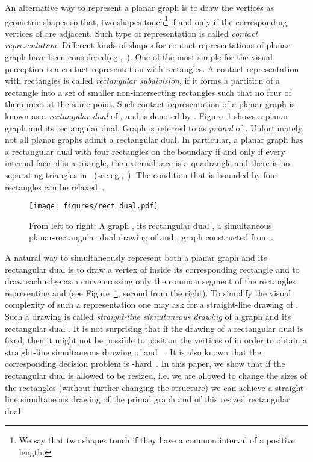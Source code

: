 \documentclass{llncs}
\begin{document}
An alternative way to represent a planar graph   is to draw the vertices as geometric shapes so that, two shapes touch\footnote{We say that two shapes touch if they have a common interval of a positive length.} if and only if the corresponding vertices of  are adjacent. Such type of representation is called \emph{contact representation}. Different kinds of shapes for contact representations of planar graph have been considered(eg.,~\cite{AlamBFKK12,FraysseixMR94,DuncanGHKK12,GoncalvesLP12}). One of the most  simple  for the visual perception is a contact representation with rectangles. 
A contact representation with rectangles is called  \emph{rectangular subdivision}, if it forms a partition of a rectangle into a set of smaller non-intersecting rectangles such that no four of them meet at the same point. Such contact representation of a planar graph  is known as a \emph{rectangular dual} of , and is denoted by . Figure~\ref{fig:rect_dual} shows a planar graph and its rectangular dual.  Graph   is referred to as \emph{primal} of . Unfortunately, not all planar graphs admit a rectangular dual. In particular, a planar graph  has a rectangular dual  with four rectangles on the boundary if and only if every internal face of  is a triangle, the external face is a quadrangle and there is  no separating triangles in ~(see eg.,~\cite[Theorem~2.1]{He99}). The condition that  is bounded by four rectangles can be relaxed~\cite{He93}.

\begin{figure}[htb]
\centering
\texttt{[image: figures/rect\_dual.pdf]}
\caption{From left to right: A graph , its rectangular dual , a simultaneous planar-rectangular dual drawing of  and , graph  constructed from . }
\label{fig:rect_dual}
\end{figure}

A natural way to simultaneously represent both a planar graph  and its rectangular dual  is to draw a vertex of  inside its corresponding rectangle  and to draw each edge  as a curve crossing only the common segment of the rectangles representing  and  (see Figure~\ref{fig:rect_dual}, second from the right). To simplify the visual complexity of such a representation one may ask for a straight-line drawing of .  Such a drawing is called \emph{straight-line simultaneous  drawing} of a graph  and  its rectangular dual .    It is not surprising that if the drawing of a rectangular dual  is fixed, then it might not be possible to position the vertices of   in order to obtain a straight-line simultaneous drawing of  and ~\cite[Lemma~1]{AlamKKM14}. It is also known that the corresponding  decision problem is -hard~\cite[Theorem~1]{AlamKKM14}. In this paper, we show that if the rectangular dual  is allowed to be resized, i.e. we are allowed to change the sizes of the rectangles (without further changing the structure) we can achieve a straight-line simultaneous drawing of the primal graph  and of this resized rectangular dual. 
\end{document}
